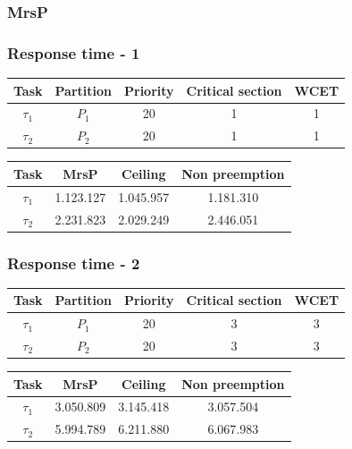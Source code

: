 \documentclass{beamer}
\begin{document}
\begin{frame}
\frametitle{MrsP}
\centerline{}
\end{frame}

\begin{frame}

  \frametitle{Response time - 1}

  \begin{table}
  \centering
  \begin{tabular}{ccccc}
  \hline\hline
    Task & Partition     & Priority & Critical section & WCET  \\ \hline
    $\tau_1$ & $P_1$  & 20 & 1 & 1 \\
    $\tau_2$ & $P_2$  & 20 & 1 & 1 \\
    \hline
    \end{tabular}
  \end{table}

  \begin{table}
  \centering
  \begin{tabular}{cccc}
  \hline\hline
    Task & MrsP & Ceiling & Non preemption \\ \hline
    $\tau_1$ & 1.123.127 & 1.045.957 & 1.181.310 \\
    $\tau_2$ & 2.231.823 & 2.029.249 & 2.446.051 \\
    \hline
    \end{tabular}
  \end{table}

\end{frame}

\begin{frame}

  \frametitle{Response time - 2}

  \begin{table}
  \centering
  \begin{tabular}{ccccc}
  \hline\hline
    Task & Partition     & Priority & Critical section & WCET  \\ \hline
    $\tau_1$ & $P_1$  & 20 & 3 & 3 \\
    $\tau_2$ & $P_2$  & 20 & 3 & 3 \\
    \hline
    \end{tabular}
  \end{table}

  \begin{table}
  \centering
  \begin{tabular}{cccc}
  \hline\hline
    Task & MrsP & Ceiling & Non preemption \\ \hline
    $\tau_1$ & 3.050.809 & 3.145.418 & 3.057.504 \\
    $\tau_2$ & 5.994.789 & 6.211.880 & 6.067.983 \\
    \hline
    \end{tabular}
  \end{table}

\end{frame}
\end{document}

